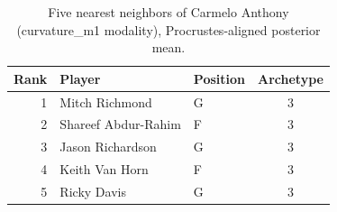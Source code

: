 \begin{table}[htbp]
  \centering\small
  \begin{tabular}{rllc}
    \toprule
    Rank & Player & Position & Archetype \\
    \midrule
    1 & Mitch Richmond & G & 3 \\
    2 & Shareef Abdur-Rahim & F & 3 \\
    3 & Jason Richardson & G & 3 \\
    4 & Keith Van Horn & F & 3 \\
    5 & Ricky Davis & G & 3 \\
    \bottomrule
  \end{tabular}
  \caption{Five nearest neighbors of Carmelo Anthony (curvature_m1 modality), Procrustes-aligned posterior mean.}
  \label{tab:Carmelo_Anthony_neighbors_curvature_m1}
\end{table}

